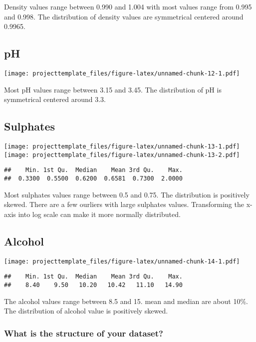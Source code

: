 \documentclass[]{article}
\begin{document}
Density values range between 0.990 and 1.004 with most values range from
0.995 and 0.998. The distribution of density values are symmetrical
centered around 0.9965.

\subsection{pH}\label{ph}

\texttt{[image: projecttemplate\_files/figure-latex/unnamed-chunk-12-1.pdf]}

Most pH values range between 3.15 and 3.45. The distribution of pH is
symmetrical centered around 3.3.

\subsection{Sulphates}\label{sulphates}

\texttt{[image: projecttemplate\_files/figure-latex/unnamed-chunk-13-1.pdf]}
\texttt{[image: projecttemplate\_files/figure-latex/unnamed-chunk-13-2.pdf]}

\begin{verbatim}
##    Min. 1st Qu.  Median    Mean 3rd Qu.    Max. 
##  0.3300  0.5500  0.6200  0.6581  0.7300  2.0000
\end{verbatim}

Most sulphates values range between 0.5 and 0.75. The distribution is
positively skewed. There are a few ourliers with large sulphates values.
Transforming the x-axis into log scale can make it more normally
distributed.

\subsection{Alcohol}\label{alcohol}

\texttt{[image: projecttemplate\_files/figure-latex/unnamed-chunk-14-1.pdf]}

\begin{verbatim}
##    Min. 1st Qu.  Median    Mean 3rd Qu.    Max. 
##    8.40    9.50   10.20   10.42   11.10   14.90
\end{verbatim}

The alcohol values range between 8.5 and 15. mean and median are about
10\%. The distribution of alcohol value is positively skewed.

\subsubsection{What is the structure of your
dataset?}\label{what-is-the-structure-of-your-dataset}
\end{document}
